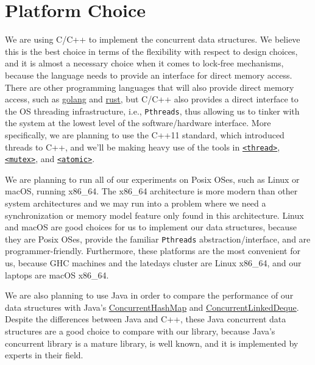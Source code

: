\documentclass[11pt]{article}
\begin{document}
\section*{Platform Choice}
We are using C/C++ to implement the concurrent data structures. We believe this
is the best choice in terms of the flexibility with respect to design
choices, and it is almost a necessary choice when it comes to lock-free
mechanisms, because the language needs to provide an interface for direct memory
access. There are other programming languages that will also provide direct
memory access, such as \href{https://golang.org/}{golang} and
\href{https://www.rust-lang.org/en-US/}{rust}, but C/C++ also provides a direct
interface to the OS threading infrastructure, i.e., \texttt{Pthreads}, thus
allowing us to tinker with the system at the lowest level of the software/hardware
interface. More specifically, we are planning to use the C++11 standard, which
introduced threads to C++, and we'll be making heavy use of the tools in
\href{http://en.cppreference.com/w/cpp/header/thread}{\texttt{<thread>}},
\href{http://en.cppreference.com/w/cpp/header/mutex}{\texttt{<mutex>}}, and
\href{http://en.cppreference.com/w/cpp/header/atomic}{\texttt{<atomic>}}.

We are planning to run all of our experiments on Posix OSes, such as Linux or
macOS, running x86\_64. The x86\_64 architecture is more modern than other
system architectures and we may run into a problem where we need a
synchronization or memory model feature only found in this architecture. Linux
and macOS are good choices for us to implement our data structures, because they
are Posix OSes, provide the familiar \texttt{Pthreads} abstraction/interface,
and are programmer-friendly. Furthermore, these platforms are the most
convenient for us, because GHC machines and the latedays cluster are Linux
x86\_64, and our laptops are macOS x86\_64.

We are also planning to use Java in order to compare the performance of our data structures with Java's
\href{https://docs.oracle.com/javase/8/docs/api/java/util/concurrent/ConcurrentHashMap.html}{ConcurrentHashMap} and
\href{https://docs.oracle.com/javase/8/docs/api/java/util/concurrent/ConcurrentLinkedDeque.html}{ConcurrentLinkedDeque}.
Despite the differences between Java and C++, these Java concurrent data
structures are a good choice to compare with our library, because Java's
concurrent library is a mature library, is well known, and it is implemented by
experts in their field.
\end{document}
